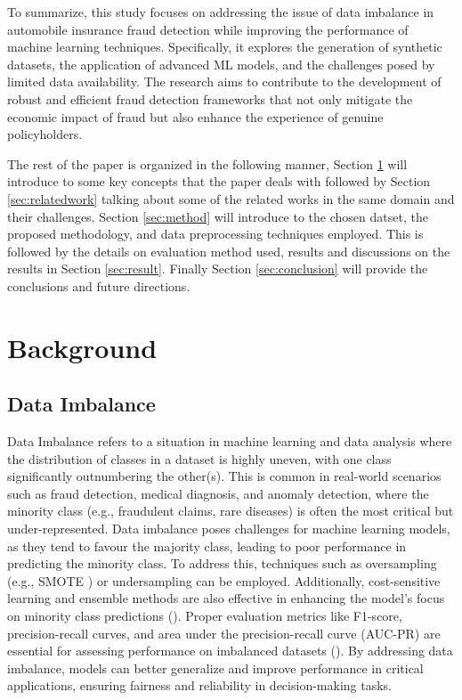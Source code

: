 \documentclass[twoside,11pt]{article}
\begin{document}
To summarize, this study focuses on addressing the issue of data imbalance in automobile insurance fraud detection while improving the performance of machine learning techniques. Specifically, it explores the generation of synthetic datasets, the application of advanced ML models, and the challenges posed by limited data availability. The research aims to contribute to the development of robust and efficient fraud detection frameworks that not only mitigate the economic impact of fraud but also enhance the experience of genuine policyholders.

The rest of the paper is organized in the following manner, Section \ref{sec:background} will introduce to some key concepts that the paper deals with followed by Section \ref{sec:relatedwork} talking about some of the related works in the same domain and their challenges. Section \ref{sec:method} will introduce to the chosen datset, the proposed methodology, and data preprocessing techniques employed. This is followed by the details on evaluation method used, results and discussions on the results in Section \ref{sec:result}. Finally Section \ref{sec:conclusion} will provide the conclusions and future directions.

\section{Background} \label{sec:background}
\subsection{Data Imbalance}
Data Imbalance refers to a situation in machine learning and data analysis where the distribution of classes in a dataset is highly uneven, with one class significantly outnumbering the other(s). This is common in real-world scenarios such as fraud detection, medical diagnosis, and anomaly detection, where the minority class (e.g., fraudulent claims, rare diseases) is often the most critical but under-represented. Data imbalance poses challenges for machine learning models, as they tend to favour the majority class, leading to poor performance in predicting the minority class.
To address this, techniques such as oversampling (e.g., SMOTE \citealp{chawlaSMOTESyntheticMinority2002}) or undersampling can be employed. Additionally, cost-sensitive learning and ensemble methods are also effective in enhancing the model's focus on minority class predictions (\citealp{garcia2009}). Proper evaluation metrics like F1-score, precision-recall curves, and area under the precision-recall curve (AUC-PR) are essential for assessing performance on imbalanced datasets (\citealp{fernandezPerformanceMeasures2018a}).
By addressing data imbalance, models can better generalize and improve performance in critical applications, ensuring fairness and reliability in decision-making tasks.
\end{document}
